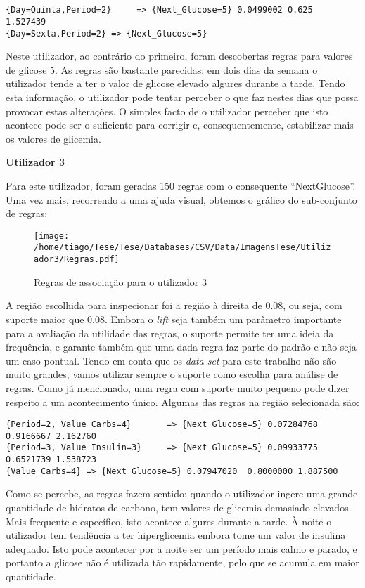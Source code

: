 \begin{lstlisting}


{Day=Quinta,Period=2}     => {Next_Glucose=5} 0.0499002 0.625      1.527439
{Day=Sexta,Period=2} => {Next_Glucose=5}

\end{lstlisting}
Neste utilizador, ao contrário do primeiro, foram descobertas regras para valores de glicose 5. As regras são bastante parecidas: em dois dias da semana o utilizador tende a ter o valor de glicose elevado algures durante a tarde. Tendo esta informação, o utilizador pode tentar perceber o que faz nestes dias que possa provocar estas alterações. O simples facto de o utilizador perceber que isto acontece pode ser o suficiente para corrigir e, consequentemente, estabilizar mais os valores de glicemia.


\textbf{Utilizador 3}

Para este utilizador, foram geradas 150 regras com o consequente ``Next\textunderscore Glucose''. Uma vez mais, recorrendo a uma ajuda visual, obtemos o gráfico do sub-conjunto de regras:


\begin{figure}[H]
\centering
\texttt{[image: /home/tiago/Tese/Tese/Databases/CSV/Data/ImagensTese/Utilizador3/Regras.pdf]}
\caption{Regras de associação para o utilizador 3}
\end{figure}
A região escolhida para inspecionar foi a região à direita de 0.08, ou seja, com suporte maior que 0.08. Embora o \textit{lift} seja também um parâmetro importante para a avaliação da utilidade das regras, o suporte permite ter uma ideia da frequência, e garante também que uma dada regra faz parte do padrão e não seja um caso pontual. Tendo em conta que os \textit{data set} para este trabalho não são muito grandes, vamos utilizar sempre o suporte como escolha para análise de regras. Como já mencionado, uma regra com suporte muito pequeno pode dizer respeito a um acontecimento único. Algumas das regras na região selecionada são:

\begin{lstlisting}
{Period=2, Value_Carbs=4}       => {Next_Glucose=5} 0.07284768  0.9166667 2.162760  
{Period=3, Value_Insulin=3}     => {Next_Glucose=5} 0.09933775  0.6521739 1.538723
{Value_Carbs=4} => {Next_Glucose=5} 0.07947020  0.8000000 1.887500
\end{lstlisting}
Como se percebe, as regras fazem sentido: quando o utilizador ingere uma grande quantidade de hidratos de carbono, tem valores de glicemia demasiado elevados. Mais frequente e específico, isto acontece algures durante a tarde. À noite o utilizador tem tendência a ter hiperglicemia embora tome um valor de insulina adequado. Isto pode acontecer por a noite ser um período mais calmo e parado, e portanto a glicose não é utilizada tão rapidamente, pelo que se acumula em maior quantidade. 

